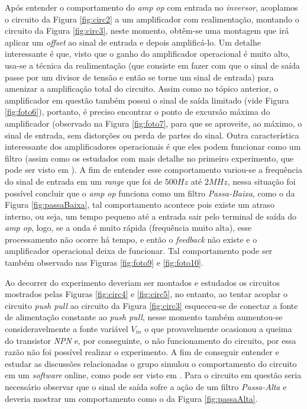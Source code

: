     Após entender o comportamento do \emph{amp op} com entrada no \emph{inversor}, acoplamos o circuito da Figura \ref{fig:circ2} a um amplificador com realimentação, montando o circuito da Figura \ref{fig:circ3}, neste momento, obtêm-se uma montagem que irá aplicar um \emph{offset} ao sinal de entrada e depois amplificá-lo. Um detalhe interessante é que, visto que o ganho do amplificador operacional é muito alto, usa-se a técnica da realimentação (que consiste em fazer com que o sinal de saída passe por um divisor de tensão e então se torne um sinal de entrada) para amenizar a amplificação total do circuito. Assim como no tópico anterior, o amplificador em questão também possui o sinal de saída limitado (vide Figura \ref{fig:foto6}), portanto, é preciso encontrar o ponto de excursão máxima do amplificador (observado na Figura \ref{fig:foto7}, para que se aproveite, ao máximo, o sinal de entrada, sem distorções ou perda de partes do sinal. Outra característica interessante dos amplificadores operacionais é que eles podem funcionar como um filtro (assim como os estudados com mais detalhe no primeiro experimento, que pode ser visto em \cite{ref:exp1}). A fim de entender esse comportamento variou-se a frequência do sinal de entrada em um \emph{range} que foi de $500Hz$ até $2MHz$, nessa situação foi possível concluir que o \emph{amp op} funciona como um filtro \emph{Passa-Baixa}, como o da Figura \ref{fig:passaBaixa}, tal comportamento acontece pois existe um atraso interno, ou seja, um tempo pequeno até a entrada sair pelo terminal de saída do \emph{amp op}, logo, se a onda é muito rápida (frequência muito alta), esse processamento não ocorre há tempo, e então o \emph{feedback} não existe e o amplificador operacional deixa de funcionar. Tal comportamento pode ser também observado nas Figuras \ref{fig:foto9} e \ref{fig:foto10}.

    Ao decorrer do experimento deveriam ser montados e estudados os circuitos mostrados pelas Figuras \ref{fig:circ4} e \ref{fig:circ5}, no entanto, ao tentar acoplar o circuito \emph{push pull} ao circuito da Figura \ref{fig:circ3} esqueceu-se de conectar a fonte de alimentação constante ao \emph{push pull}, nesse momento também aumentou-se consideravelmente a fonte variável $V_{in}$ o que provavelmente ocasionou a queima do transistor \emph{NPN} e, por conseguinte, o não funcionamento do circuito, por essa razão não foi possível realizar o experimento. A fim de conseguir entender e estudar as discussões relacionadas o grupo simulou o comportamento do circuito em um \emph{software} online, como pode ser visto em \cite{ref:simu}. Para o circuito em questão seria necessário observar que o sinal de saída sofre a ação de um filtro \emph{Passa-Alta} e deveria mostrar um comportamento como o da Figura \ref{fig:passaAlta}.
